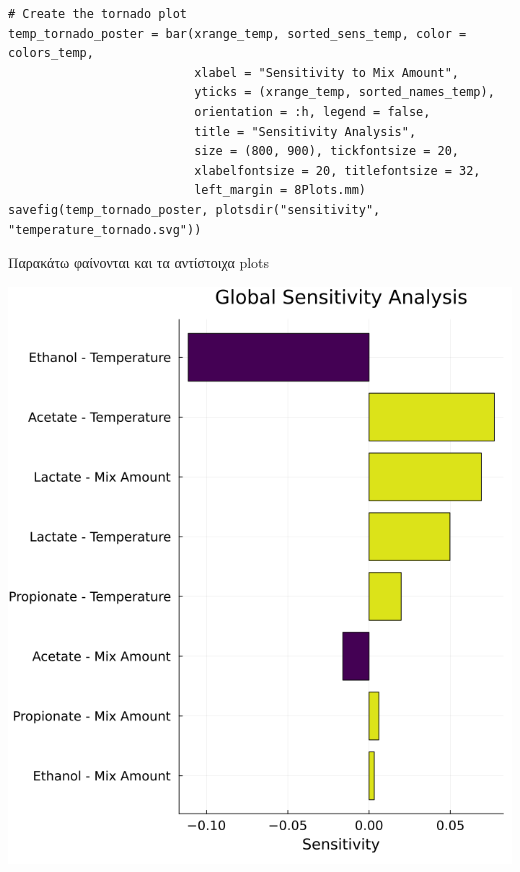 \documentclass[11pt]{article}
\begin{document}
\begin{verbatim}
# Create the tornado plot
temp_tornado_poster = bar(xrange_temp, sorted_sens_temp, color = colors_temp,
                          xlabel = "Sensitivity to Mix Amount",
                          yticks = (xrange_temp, sorted_names_temp),
                          orientation = :h, legend = false,
                          title = "Sensitivity Analysis",
                          size = (800, 900), tickfontsize = 20,
                          xlabelfontsize = 20, titlefontsize = 32,
                          left_margin = 8Plots.mm)
savefig(temp_tornado_poster, plotsdir("sensitivity", "temperature_tornado.svg"))
\end{verbatim}

Παρακάτω φαίνονται και τα αντίστοιχα plots

\begin{center}
\includegraphics[width=.9\linewidth]{../plots/sensitivity/global_tornado.png}
\end{center}
\end{document}
